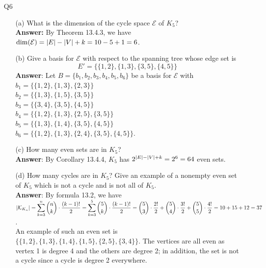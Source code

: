 \documentclass{article}
\begin{document}
\newpage
\begin{itemize}
      \item [Q6]
            \begin{itemize}
                  \item [(a)] What is the dimension of the cycle space $\mathcal{E}$ of $K_5$?\\
                        \textbf{Answer:} By Theorem 13.4.3, we have $\dim(\mathcal{E})=\abs{E}-\abs{V}+k=10-5+1=6$.
                  \item [(b)] Give a basis for $\mathcal{E}$ with respect to the spanning tree whose edge set is \[E'=\{\{1,2\},\{1,3\},\{3,5\},\{4,5\}\}\]
                        \textbf{Answer}: Let $B=\{b_1,b_2,b_3,b_4,b_5,b_6\}$ be a basis for $\mathcal{E}$ with\\
                        $b_1=\{\{1,2\},\{1,3\},\{2,3\}\}$\\
                        $b_2=\{\{1,3\},\{1,5\},\{3,5\}\}$\\
                        $b_3=\{\{3,4\},\{3,5\},\{4,5\}\}$\\
                        $b_4=\{\{1,2\},\{1,3\},\{2,5\},\{3,5\}\}$\\
                        $b_5=\{\{1,3\},\{1,4\},\{3,5\},\{4,5\}\}$\\
                        $b_6=\{\{1,2\},\{1,3\},\{2,4\},\{3,5\},\{4,5\}\}$.
                  \item [(c)] How many even sets are in $K_5$?\\
                        \textbf{Answer}: By Corollary 13.4.4, $K_5$ has $2^{\abs{E}-\abs{V}+k}=2^{6}=64$ even sets.
                  \item [(d)] How many cycles are in $K_5$? Give an example of a nonempty even set of $K_5$ which is not a cycle and is not all of $K_5$.\\
                        \textbf{Answer}: By formula 13.2, we have $\abs{\mathcal{K}_{K_n}}=\mathlarger{\sum_{k=3}^n\binom{n}{k}}\cdot\dfrac{(k-1)!}{2}=\mathlarger{\sum_{k=3}^5\binom{5}{k}}\cdot\dfrac{(k-1)!}{2}=\mathlarger{\binom{5}{3}}\cdot\dfrac{2!}{2}+\mathlarger{\binom{5}{4}}\cdot\dfrac{3!}{2}+\mathlarger{\binom{5}{5}}\cdot\dfrac{4!}{2}=10+15+12=37$.\\
                        An example of such an even set is $\{\{1,2\},\{1,3\},\{1,4\},\{1,5\},\{2,5\},\{3,4\}\}$. The vertices are all even as vertex 1 is degree 4 and the others are degree 2; in addition, the set is not a cycle since a cycle is degree 2 everywhere.
            \end{itemize}
\end{itemize}
\end{document}
